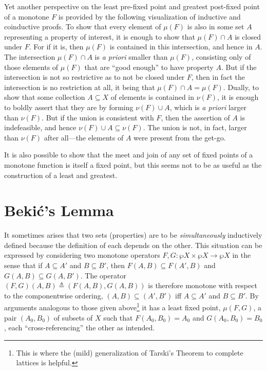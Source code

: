 \documentclass[11pt,twoside]{article}
\newcommand{\eqdef}{\mathrel{\triangleq}}
\begin{document}
\smallskip

Yet another perspective on the least pre-fixed point and greatest post-fixed point of a
monotone $F$ is provided by the following visualization of inductive and coinductive
proofs.  To show that every element of $\mu(F)$ is also in some set $A$ representing a
property of interest, it is enough to show that $\mu(F)\cap A$ is closed under $F$.  For if it
is, then $\mu(F)$ is contained in this intersection, and hence in $A$.  The intersection
$\mu(F)\cap A$ is \emph{a priori} smaller than $\mu(F)$, consisting only of those elements of
$\mu(F)$ that are ``good enough'' to have property $A$.  But if the intersection is not so
restrictive as to not be closed under $F$, then in fact the intersection is no restriction
at all, it being that $\mu(F)\cap A=\mu(F)$.  Dually, to show that some collection
$A\subseteq X$ of elements is contained in $\nu(F)$, it is enough to boldly assert that they are by
forming $\nu(F)\cup A$, which is \emph{a priori} larger than $\nu(F)$.  But if the union is
consistent with $F$, then the assertion of $A$ is indefeasible, and hence
$\nu(F)\cup A\subseteq\nu(F)$.  The union is not, in fact, larger than $\nu(F)$ after all---the elements of
$A$ were present from the get-go.

\smallskip

It is also possible to show that the meet and join of any set of fixed points of a
monotone function is itself a fixed point, but this seems not to be as useful as the
construction of a least and greatest.

\section{Beki\'{c}'s Lemma}

It sometimes arises that two sets (properties) are to be \emph{simultaneously} inductively
defined because the definition of each depends on the other.  This situation can be
expressed by considering two monotone operators $F, G : \wp{X}\times\wp{X}\to\wp{X}$ in the sense that
if $A\subseteq A'$ and $B\subseteq B'$, then $F(A,B)\subseteq F(A',B)$ and
$G(A,B)\subseteq G(A,B')$.  The operator $(F,G)(A,B)\eqdef (F(A,B),G(A,B))$ is therefore monotone
with respect to the componentwise ordering, $(A,B)\subseteq (A',B')$ iff $A\subseteq A'$ and
$B\subseteq B'$.  By arguments analogous to those given above\footnote{This is where the (mild)
  generalization of Tarski's Theorem to complete lattices is helpful.} it has a least
fixed point, $\mu(F, G)$, a pair $(A_{0},B_{0})$ of subsets of $X$ such that
$F(A_{0},B_{0})=A_{0}$ and $G(A_{0},B_{0})=B_{0}$, each ``cross-referencing'' the other as
intended.
\end{document}
